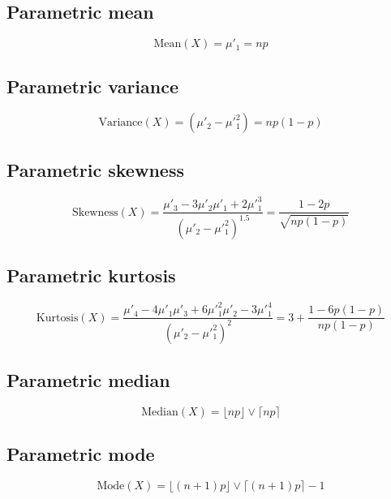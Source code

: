 \documentclass{article}
\begin{document}
\subsection{Parametric mean}
\begin{equation*} \mathrm{Mean}(X)=\mu'_{1}=np \end{equation*}
\subsection{Parametric variance}
\begin{equation*} \mathrm{Variance}(X)=(\mu'_{2}-\mu'^{2}_{1})=np(1-p) \end{equation*}
\subsection{Parametric skewness}
\begin{equation*} \mathrm{Skewness}(X)=\frac{\mu'_{3}-3\mu'_{2}\mu'_{1}+2\mu'^{3}_{1}}{(\mu'_{2}-\mu'^{2}_{1})^{1.5}}=\frac{1-2p}{\sqrt{np(1-p)}} \end{equation*}
\subsection{Parametric kurtosis}
\begin{equation*} \mathrm{Kurtosis}(X)=\frac{\mu'_{4}-4\mu'_{1}\mu'_{3}+6\mu'^{2}_{1}\mu'_{2}-3\mu'^{4}_{1}}{(\mu'_{2}-\mu'^{2}_{1})^{2}}=3+\frac{1-6p(1-p)}{np(1-p)} \end{equation*}
\subsection{Parametric median}
\begin{equation*} \mathrm{Median}(X)=\lfloor{np}\rfloor \vee \lceil{np}\rceil \end{equation*}
\subsection{Parametric mode}
\begin{equation*} \mathrm{Mode}(X)=\lfloor (n + 1)p \rfloor \vee \lceil (n + 1)p \rceil - 1 \end{equation*}
\end{document}
